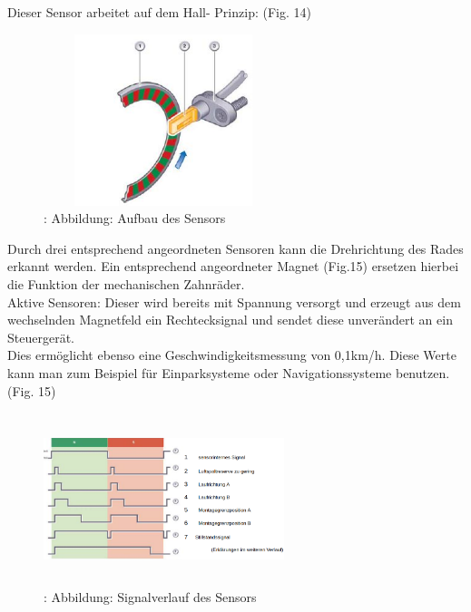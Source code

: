 				Dieser Sensor arbeitet auf dem Hall- Prinzip: (Fig. 14)
				\begin{figure}
					\centering
					\includegraphics[width=7cm, height=5cm] {radsensor.png}
					\caption {\cite{TS26}: Abbildung: Aufbau des Sensors}
				\end{figure}
			
				Durch drei entsprechend angeordneten Sensoren kann die Drehrichtung des Rades erkannt werden. Ein entsprechend angeordneter Magnet (Fig.15) ersetzen hierbei die Funktion der mechanischen Zahnräder.\\
				Aktive Sensoren: Dieser wird bereits mit Spannung versorgt und erzeugt aus dem wechselnden Magnetfeld ein Rechtecksignal und sendet diese unverändert an ein Steuergerät.\\
				Dies ermöglicht ebenso eine Geschwindigkeitsmessung von 0,1km/h. Diese Werte kann man zum Beispiel für Einparksysteme oder Navigationssysteme benutzen.\cite{TS_drehzahl_sensor}
				(Fig. 15)

				\begin{figure}
					\centering
					\includegraphics[width=7cm, height=5cm] {signalverlauf_hall.png}
					\caption {\cite{TS_drehzahl_sensor_pic}: Abbildung: Signalverlauf des Sensors}
				\end{figure}

